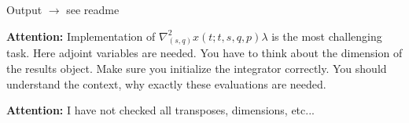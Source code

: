 \documentclass[12pt]{article}
\begin{document}
Output $\rightarrow$ see readme


\textbf{Attention:} Implementation of $\nabla^2_{(s,q)} x(t;t,s,q,p) \lambda$ is the most challenging task. 
Here adjoint variables are needed. 
You have to think about the dimension of the results object. Make sure you initialize the integrator correctly. 
You should understand the context, why exactly these evaluations are needed.


\textbf{Attention:} I have not checked all transposes, dimensions, etc...
\end{document}
